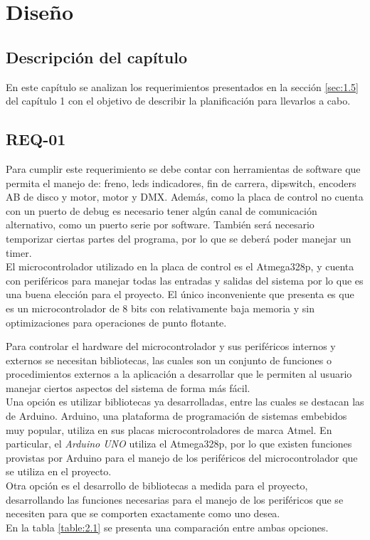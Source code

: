 \chapter{Diseño}
\thispagestyle{empty}

\section{Descripción del capítulo} \label{sec:\thesection}
En este capítulo se analizan los requerimientos presentados en la sección \ref{sec:1.5} del capítulo 1 con el objetivo de describir la planificación para llevarlos a cabo.

\section{REQ-01} \label{sec:\thesection}
Para cumplir este requerimiento se debe contar con herramientas de software que permita el manejo de: freno, leds indicadores, fin de carrera, dipswitch, encoders AB de disco y motor, motor y DMX. Además, como la placa de control no cuenta con un puerto de debug es necesario tener algún canal de comunicación alternativo, como un puerto serie por software. También será necesario temporizar ciertas partes del programa, por lo que se deberá poder manejar un timer.\\
El microcontrolador utilizado en la placa de control es el Atmega328p, y cuenta con periféricos para manejar todas las entradas y salidas del sistema por lo que es una buena elección para el proyecto. El único inconveniente que presenta es que es un microcontrolador de 8 bits con relativamente baja memoria y sin optimizaciones para operaciones de punto flotante. 

Para controlar el hardware del microcontrolador y sus periféricos internos y externos se necesitan bibliotecas, las cuales son un conjunto de funciones o procedimientos externos a la aplicación a desarrollar que le permiten al usuario manejar ciertos aspectos del sistema de forma más fácil.\\
Una opción es utilizar bibliotecas ya desarrolladas, entre las cuales se destacan las de Arduino. Arduino, una plataforma de programación de sistemas embebidos muy popular, utiliza en sus placas microcontroladores de marca Atmel. En particular, el \textit{Arduino UNO} utiliza el Atmega328p, por lo que existen funciones provistas por Arduino para el manejo de los periféricos del microcontrolador que se utiliza en el proyecto. \\
Otra opción es el desarrollo de bibliotecas a medida para el proyecto, desarrollando las funciones necesarias para el manejo de los periféricos que se necesiten para que se comporten exactamente como uno desea.\\
En la tabla \ref{table:2.1} se presenta una comparación entre ambas opciones.

